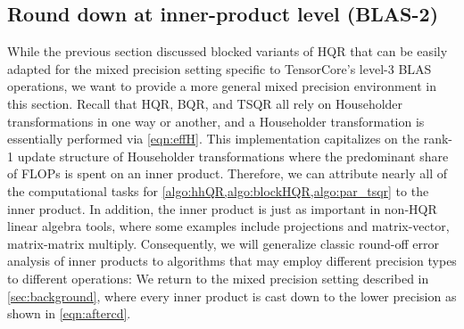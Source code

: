 \subsection{Round down at inner-product level (BLAS-2)}\label{sec:mp-2}
While the previous section discussed blocked variants of HQR that can be easily adapted for the mixed precision setting specific to TensorCore's level-3 BLAS operations, we want to provide a more general mixed precision environment in this section.
Recall that HQR, BQR, and TSQR all rely on Householder transformations in one way or another, and a Householder transformation is essentially performed via \cref{eqn:effH}.
This implementation capitalizes on the rank-1 update structure of Householder transformations where the predominant share of FLOPs is spent on an inner product.
Therefore, we can attribute nearly all of the computational tasks for \cref{algo:hhQR,algo:blockHQR,algo:par_tsqr} to the inner product.
In addition, the inner product is just as important in non-HQR linear algebra tools, where some examples include projections and matrix-vector, matrix-matrix multiply.
Consequently, we will generalize classic round-off error analysis of inner products to algorithms that may employ different precision types to different operations: We return to the mixed precision setting described in \cref{sec:background}, where every inner product is cast down to the lower precision as shown in \cref{eqn:aftercd}.





























